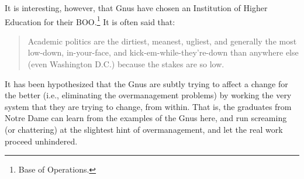 It is interesting, however, that Gnus have chosen an Institution of
Higher Education for their BOO.\footnote{Base of Operations.}  It is
often said that:
\begin{quote}
  Academic politics are the dirtiest, meanest, ugliest, and generally
  the most low-down, in-your-face, and kick-em-while-they're-down than
  anywhere else (even Washington D.C.)  because the stakes are so low.
\end{quote}
It has been hypothesized that the Gnus are subtly trying to affect a
change for the better (i.e., eliminating the overmanagement problems)
by working the very system that they are trying to change, from
within.  That is, the graduates from Notre Dame can learn from the
examples of the Gnus here, and run screaming (or chattering) at the
slightest hint of overmanagement, and let the real work proceed
unhindered.

%
% 
% 
